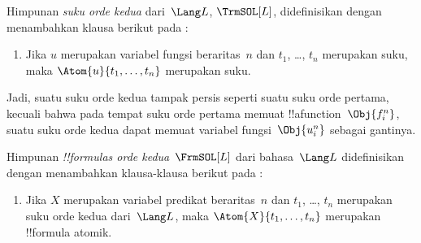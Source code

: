 \documentclass[../../../include/open-logic-section]{subfiles}
\begin{document}
\begin{defn}
Himpunan \emph{suku orde kedua} dari~$\Lang L$, $\TrmSOL[L]$, didefinisikan
dengan menambahkan klausa berikut pada :
\begin{enumerate}
\item Jika $u$ merupakan variabel fungsi beraritas~$n$ dan $t_1$, \dots,
  $t_n$ merupakan suku, maka $\Atom{u}{t_1, \ldots, t_n}$ merupakan suku.
\end{enumerate}
\end{defn}

\begin{explain}
Jadi, suatu suku orde kedua tampak persis seperti suatu suku orde pertama,
kecuali bahwa pada tempat suku orde pertama memuat !!a{function}~$\Obj{f^n_i}$,
suatu suku orde kedua dapat memuat variabel fungsi~$\Obj{u^n_i}$ sebagai
gantinya.
\end{explain}

\begin{defn}
Himpunan \emph{!!{formula}s orde kedua}~$\FrmSOL[L]$ dari bahasa~$\Lang L$
didefinisikan dengan menambahkan klausa-klausa berikut pada
:
\begin{enumerate}
\item Jika $X$ merupakan variabel predikat beraritas~$n$ dan $t_1$, \dots,
  $t_n$ merupakan suku orde kedua dari~$\Lang L$, maka
  $\Atom{X}{t_1,\ldots, t_n}$ merupakan !!{formula} atomik.




\end{enumerate}
\end{defn}
\end{document}
